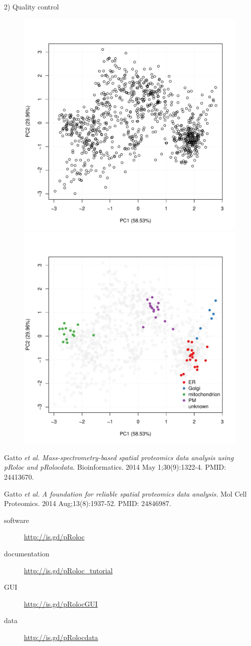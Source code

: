 \documentclass[final]{beamer}\usepackage[]{graphicx}\usepackage[]{color}
\newcommand{\challenge}[1]{
       \begin{tcolorbox}[notitle,boxrule=1pt,colback=blue!10,colframe=blue!25]
         {#1}
       \end{tcolorbox}
}
\begin{document}
\begin{frame}[fragile]
\begin{columns}
\begin{column}{.48\textwidth}
\begin{block}{2) Quality control}
      \end{block}
      \begin{figure}
        \centering
        \includegraphics[width=.49\linewidth]{./figures/pca1.pdf}
        \includegraphics[width=.49\linewidth]{./figures/pca2.pdf}
      \end{figure}


      \challenge{        
        Gatto \textit{et al.} \emph{Mass-spectrometry-based spatial
          proteomics data analysis using pRoloc and pRolocdata.}
        Bioinformatics. 2014 May 1;30(9):1322-4. PMID: 24413670.

        \noindent Gatto \textit{et al.}  \emph{A foundation for
          reliable spatial proteomics data analysis.}  Mol Cell
        Proteomics. 2014 Aug;13(8):1937-52. PMID: 24846987.

        \vspace{2mm}
        \begin{description}
        \item[software] \url{http://is.gd/pRoloc}
        \item[documentation] \url{http://is.gd/pRoloc_tutorial}
        \item[GUI] \url{http://is.gd/pRolocGUI}
        \item[data] \url{http://is.gd/pRolocdata}  
        \end{description}
        \vspace{2mm}
    }


\end{column}
\end{columns}
\end{frame}
\end{document}
